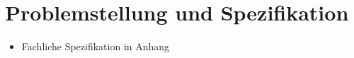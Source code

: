 \section{Problemstellung und Spezifikation}
\begin{itemize}
	\item Fachliche Spezifikation in Anhang
\end{itemize}